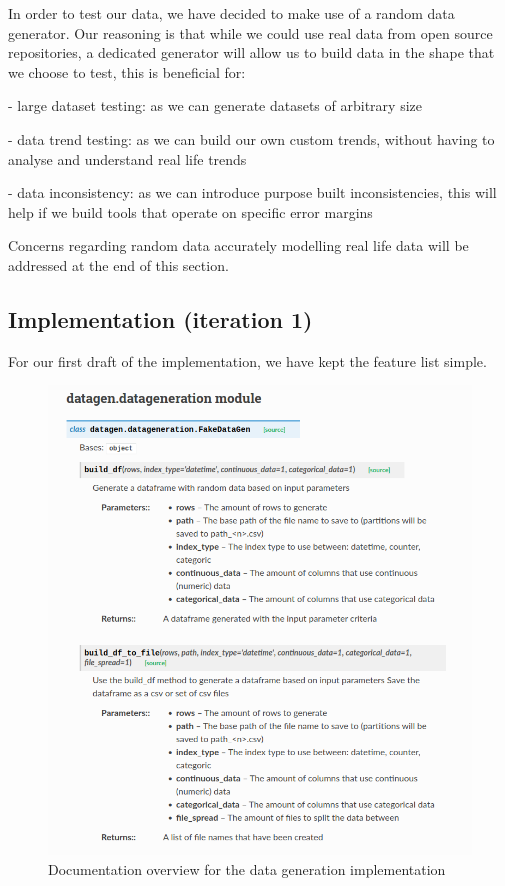 In order to test our data, we have decided to make use of a random data generator.
Our reasoning is that while we could use real data from open source repositories, a dedicated generator will allow us
to build data in the shape that we choose to test, this is beneficial for:

- large dataset testing: as we can generate datasets of arbitrary size

- data trend testing: as we can build our own custom trends, without having to analyse and understand real life trends

- data inconsistency: as we can introduce purpose built inconsistencies, this will help if we build tools that operate on specific error margins

Concerns regarding random data accurately modelling real life data will be addressed at the end of this section.

\subsection{Implementation (iteration 1)}
For our first draft of the implementation, we have kept the feature list simple.

\begin{figure}[h]
    \centering
    \includegraphics[width=12cm]{figures/data_generation/datagen_doc_v1}
    \caption{Documentation overview for the data generation implementation}
    \label{fig:datagen_doc_1}
\end{figure}

